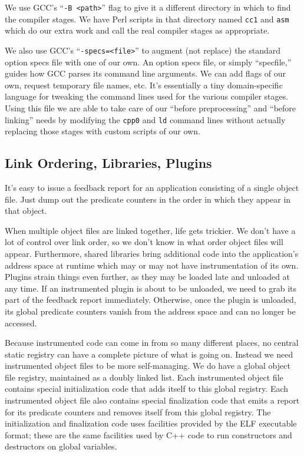 \documentclass[10pt,twocolumn]{article}
\begin{document}
We use GCC's ``\texttt{-B <path>}'' flag to give it a different
directory in which to find the compiler stages.  We have Perl scripts
in that directory named \texttt{cc1} and \texttt{asm} which do our
extra work and call the real compiler stages as appropriate.

We also use GCC's ``\texttt{-specs=<file>}'' to augment (not replace)
the standard option specs file with one of our own.  An option specs
file, or simply ``specfile,'' guides how GCC parses its command line
arguments.  We can add flags of our own, request temporary file names,
etc.  It's essentially a tiny domain-specific language for tweaking
the command lines used for the various compiler stages.  Using this
file we are able to take care of our ``before preprocessing'' and
``before linking'' needs by modifying the \texttt{cpp0} and
\texttt{ld} command lines without actually replacing those stages with
custom scripts of our own.

\subsection{Link Ordering, Libraries, Plugins}

It's easy to issue a feedback report for an application consisting of
a single object file.  Just dump out the predicate counters in the
order in which they appear in that object.

When multiple object files are linked together, life gets trickier.
We don't have a lot of control over link order, so we don't know in
what order object files will appear.  Furthermore, shared libraries
bring additional code into the application's address space at runtime
which may or may not have instrumentation of its own.  Plugins strain
things even further, as they may be loaded late and unloaded at any
time.  If an instrumented plugin is about to be unloaded, we need to
grab its part of the feedback report immediately.  Otherwise, once the
plugin is unloaded, its global predicate counters vanish from the
address space and can no longer be accessed.

Because instrumented code can come in from so many different places,
no central static registry can have a complete picture of what is
going on.  Instead we need instrumented object files to be more
self-managing.  We do have a global object file registry, maintained
as a doubly linked list.  Each instrumented object file contains
special initialization code that adds itself to this global registry.
Each instrumented object file also contains special finalization code
that emits a report for its predicate counters and removes itself from
this global registry.  The initialization and finalization code uses
facilities provided by the ELF executable format; these are the same
facilities used by C++ code to run constructors and destructors on
global variables.
\end{document}
